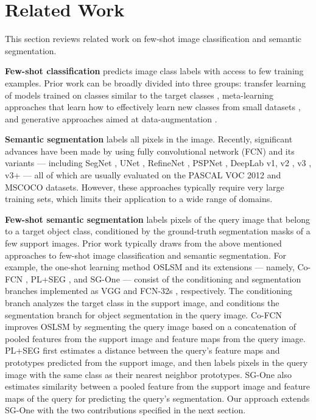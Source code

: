 \documentclass[10pt,twocolumn,letterpaper]{article}
\begin{document}
\section{Related Work}
\label{sec:related_work}
This section reviews related work on few-shot image classification and semantic segmentation. 

\textbf{Few-shot classification} predicts image class labels with access to few training examples. Prior work can be broadly divided into three groups: transfer learning of models trained on classes similar to the target classes  \cite{snell2017prototypical,ren2018meta,sung2018learning,vinyals2016matching}, meta-learning approaches that learn how to effectively learn new classes from small datasets \cite{finn2017model,nichol2018reptile}, and generative approaches aimed at data-augmentation  \cite{wang2018low,schwartz2018delta}. 

\textbf{Semantic segmentation} labels all pixels in the image. Recently, significant advances have been made by using fully convolutional network (FCN) \cite{shelhamer2016fully} and its variants --- including SegNet \cite{badrinarayanan2015segnet2}, UNet \cite{ronneberger2015unet}, RefineNet \cite{lin2016refinenet}, PSPNet \cite{zhao2016pyramid}, DeepLab v1\cite{chen2014semantic}, v2 \cite{chen2016deeplab}, v3 \cite{chen2017rethinking}, v3+ \cite{chen2018encoderdecoder} --- all of which are usually evaluated on the PASCAL VOC 2012 \cite{Everingham10} and MSCOCO \cite{lin2014microsoft} datasets. However, these approaches typically  require very large training sets, which limits their application to a wide range of domains. 

\textbf{Few-shot semantic segmentation} labels pixels of the query image that belong to a target object class, conditioned by the ground-truth segmentation masks of a few support images. Prior work typically draws from the above mentioned approaches to few-shot image classification and semantic segmentation. For example, the one-shot learning method OSLSM \cite{shaban2017one} and its extensions --- namely, Co-FCN \cite{rakelly2018conditional,rakelly2018fewshot},  PL+SEG \cite{dong2018few}, and SG-One \cite{zhang2018sgone} --- consist of the conditioning and segmentation branches implemented as  VGG \cite{simonyan2014deep} and FCN-32s \cite{shelhamer2016fully}, respectively. The conditioning branch analyzes the target class in the support image, and conditions the segmentation branch for object segmentation in the query image. Co-FCN improves OSLSM by segmenting the query image based on a concatenation of pooled features from the support image and feature maps from the query image.  PL+SEG first estimates a distance between the query's feature maps and prototypes predicted from the support image, and then labels pixels in the query image with the same class as their nearest neighbor prototypes. SG-One also estimates similarity between a pooled feature from the support image and feature maps  of the query for predicting the query's segmentation. Our approach extends SG-One with the two contributions specified in the next section.
\end{document}

